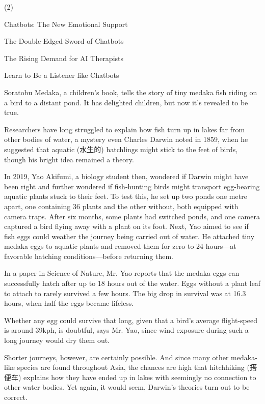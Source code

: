 \documentclass{英语试卷}
\begin{document}
\begin{choices}(2)
  \item Chatbots: The New Emotional Support
  \item The Double-Edged Sword of Chatbots
  \item The Rising Demand for AI Therapists
  \item Learn to Be a Listener like Chatbots
\end{choices}
\par Soratobu Medaka, a children's book, tells the story of tiny medaka fish riding on a bird to a distant pond. It has delighted children, but now it's revealed to be true.\par
\par Researchers have long struggled to explain how fish turn up in lakes far from other bodies of water, a mystery even Charles Darwin noted in 1859, when he suggested that aquatic (水生的) hatchlings might stick to the feet of birds, though his bright idea remained a theory.\par
\par In 2019, Yao Akifumi, a biology student then, wondered if Darwin might have been right and further wondered if fish-hunting birds might transport egg-bearing aquatic plants stuck to their feet. To test this, he set up two ponds one metre apart, one containing 36 plants and the other without, both equipped with camera traps. After six months, some plants had switched ponds, and one camera captured a bird flying away with a plant on its foot. Next, Yao aimed to see if fish eggs could weather the journey being carried out of water. He attached tiny medaka eggs to aquatic plants and removed them for zero to 24 hours—at favorable hatching conditions—before returning them.\par
\par In a paper in Science of Nature, Mr. Yao reports that the medaka eggs can successfully hatch after up to 18 hours out of the water. Eggs without a plant leaf to attach to rarely survived a few hours. The big drop in survival was at 16.3 hours, when half the eggs became lifeless.\par
\par Whether any egg could survive that long, given that a bird's average flight-speed is around 39kph, is doubtful, says Mr. Yao, since wind exposure during such a long journey would dry them out.\par
\par Shorter journeys, however, are certainly possible. And since many other medaka-like species are found throughout Asia, the chances are high that hitchhiking (搭便车) explains how they have ended up in lakes with seemingly no connection to other water bodies. Yet again, it would seem, Darwin's theories turn out to be correct.\par
\end{document}
